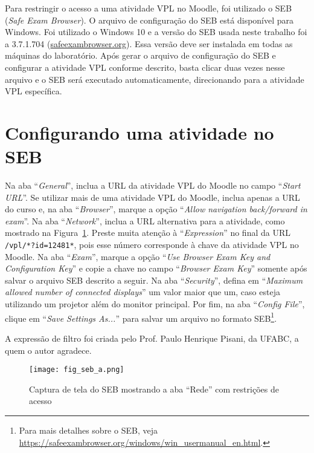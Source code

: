 \label{ch:apendiceC}

Para restringir o acesso a uma atividade VPL no Moodle, foi utilizado o SEB (\textit{Safe Exam Browser}). O arquivo de configuração do SEB está disponível para Windows. Foi utilizado o Windows 10 e a versão do SEB usada neste trabalho foi a 3.7.1.704 (\href{https://safeexambrowser.org/}{safeexambrowser.org}). Essa versão deve ser instalada em todas as máquinas do laboratório. Após gerar o arquivo de configuração do SEB e configurar a atividade VPL conforme descrito, basta clicar duas vezes nesse arquivo e o SEB será executado automaticamente, direcionando para a atividade VPL específica.

\section{Configurando uma atividade no SEB}

Na aba ``\textit{General}'', inclua a URL da atividade VPL do Moodle no campo ``\textit{Start URL}''. Se utilizar mais de uma atividade VPL do Moodle, inclua apenas a URL do curso e, na aba ``\textit{Browser}'', marque a opção ``\textit{Allow navigation back/forward in exam}''. Na aba ``\textit{Network}'', inclua a URL alternativa para a atividade, como mostrado na Figura~\ref{fig:fig_seb_a}. Preste muita atenção à ``\textit{Expression}'' no final da URL \verb|/vpl/*?id=12481*|, pois esse número corresponde à chave da atividade VPL no Moodle. Na aba ``\textit{Exam}'', marque a opção ``\textit{Use Browser Exam Key and Configuration Key}'' e copie a chave no campo ``\textit{Browser Exam Key}'' somente após salvar o arquivo SEB descrito a seguir. Na aba ``\textit{Security}'', defina em ``\textit{Maximum allowed number of connected displays}'' um valor maior que um, caso esteja utilizando um projetor além do monitor principal. Por fim, na aba ``\textit{Config File}'', clique em ``\textit{Save Settings As...}'' para salvar um arquivo no formato SEB\footnote{Para mais detalhes sobre o SEB, veja \url{https://safeexambrowser.org/windows/win_usermanual_en.html}.}.

A expressão de filtro foi criada pelo Prof. Paulo Henrique Pisani, da UFABC, a quem o autor agradece.

\begin{figure}[!ht]
\centering
\texttt{[image: fig\_seb\_a.png]}
\caption{Captura de tela do SEB mostrando a aba ``Rede'' com restrições de acesso}
\label{fig:fig_seb_a}
\end{figure}

